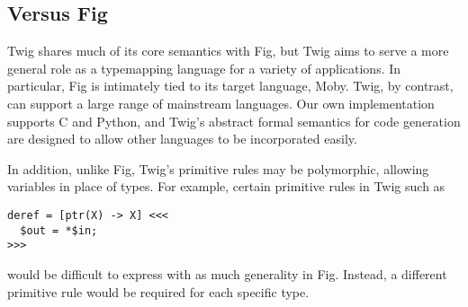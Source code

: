 \subsection{Versus Fig}

Twig shares much of its core semantics with Fig, but Twig aims to
serve a more general role as a typemapping language for a variety
of applications. In particular, Fig is intimately tied to its
target language, Moby. Twig, by contrast, can support a large
range of mainstream languages. Our own implementation supports C
and Python, and Twig's abstract formal semantics for code
generation are designed to allow other languages to be
incorporated easily.

In addition, unlike Fig, Twig's primitive rules may be
polymorphic, allowing variables in place of types. For example,
certain primitive rules in Twig such as

\begin{verbatim}
deref = [ptr(X) -> X] <<<
  $out = *$in;
>>>
\end{verbatim}

would be difficult to express with as much generality in Fig.
Instead, a different primitive rule would be required for each
specific type.
